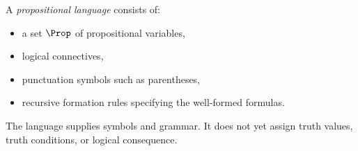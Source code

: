 \begin{tcolorbox}[colback=propbox, colframe=propborder, arc=2pt,
  left=6pt, right=6pt, top=4pt, bottom=4pt,
  title={\small\textbf{Definition (Propositional Language)}},
  fonttitle=\small\bfseries]
\label{def:propositional-language}
A \emph{propositional language} consists of:
\begin{itemize}
  \item a set $\Prop$ of propositional variables,
  \item logical connectives,
  \item punctuation symbols such as parentheses,
  \item recursive formation rules specifying the well-formed formulas.
\end{itemize}
\end{tcolorbox}

\begin{remark*}[Interpretation]
The language supplies symbols and grammar. It does not yet assign truth values,
truth conditions, or logical consequence.
\end{remark*}
